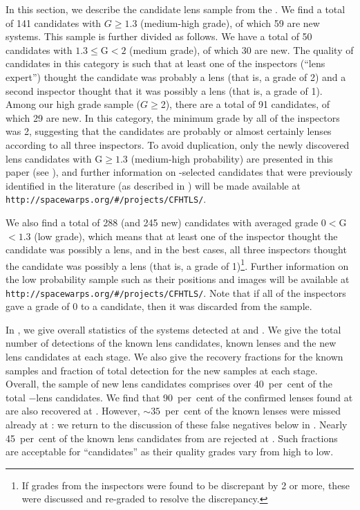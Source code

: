 \documentclass[useAMS,usenatbib,a4paper]{mn2e}
\begin{document}
In this section, we describe the \sw candidate lens sample from the
\cfhtls.  We find a total of 141 candidates with $G\ge1.3$ (medium-high
grade), of which 59 are new systems. This sample is further divided as
follows. We have a total of 50 candidates with $1.3\le$G$<2$ (medium
grade), of which 30 are new. The quality of candidates in this category
is such that at least one of the inspectors (``lens expert'') thought the candidate was
probably a lens (that is, a grade of 2) and a second inspector thought
that it was possibly a lens (that is, a grade of 1). Among our high
grade sample ($G\ge$2), there are a total of 91 candidates, of which 29
are new. In this category, the minimum grade by all of the inspectors
was 2, suggesting that the candidates are probably or almost certainly
lenses according to all three inspectors. To avoid duplication, only the
newly discovered lens candidates with G$\ge 1.3$ (medium-high
probability) are presented in this paper (see
), and further information on \sw-selected
candidates that were previously identified in the literature (as
described in ) will be made available at
\texttt{http://spacewarps.org/\#/projects/CFHTLS/}.


We also find a total of 288 (and 245 new) candidates with averaged grade
$0<$G$<1.3$ (low grade), which means that at
least one of the inspector thought the candidate was possibly a lens, and
in the best cases, all three inspectors thought the candidate was possibly
a lens (that is, a grade of 1)\footnote{If grades from the inspectors
were found to be discrepant by 2 or more, these were discussed and
re-graded to resolve the discrepancy.}. Further information on the low
probability sample such as their positions and images will be available
at \texttt{http://spacewarps.org/\#/projects/CFHTLS/}. Note that if all of the
inspectors gave a grade of 0 to a candidate, then it was discarded from
the sample.

In , we give overall statistics of the systems detected
at \StageOne and \StageTwo. We give the total number of detections of
the known lens candidates, known lenses and the new lens candidates at
each stage.  We also give the recovery fractions for the known samples
and fraction of total detection for the new samples at each stage.
Overall, the sample of new \sw lens candidates comprises over
40~per~cent of the total \sw$-$\cfhtls lens candidates. We find that
90~per~cent of the confirmed lenses found at \StageOne are also
recovered at \StageTwo.  However, $\sim35$~per~cent of the known lenses
were missed already at \StageOne: we return to the discussion of these
false negatives below in . Nearly 45~per~cent of the known
lens candidates from \StageOne are rejected at \StageTwo. Such fractions
are acceptable for ``candidates'' as their quality grades vary from high
to low.  
\end{document}
